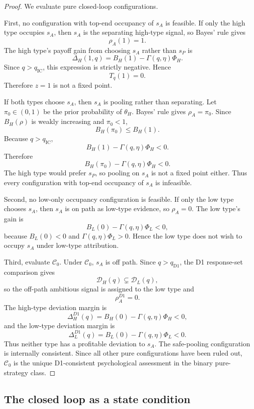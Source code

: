 \begin{proof}
We evaluate pure closed-loop configurations.

First, no configuration with top-end occupancy of \(s_A\) is feasible. If only the high type occupies \(s_A\), then \(s_A\) is the separating high-type signal, so Bayes' rule gives
\[
\rho_A(1)=1.
\]
The high type's payoff gain from choosing \(s_A\) rather than \(s_P\) is
\[
\Delta_H(1,q)=B_H(1)-\Gamma(q,\eta)\Phi_H.
\]
Since \(q>q_{\mathrm{IC}}\), this expression is strictly negative. Hence
\[
T_q(1)=0.
\]
Therefore \(z=1\) is not a fixed point.

If both types choose \(s_A\), then \(s_A\) is pooling rather than separating. Let \(\pi_0\in(0,1)\) be the prior probability of \(\theta_H\). Bayes' rule gives \(\rho_A=\pi_0\). Since \(B_H(\rho)\) is weakly increasing and \(\pi_0<1\),
\[
B_H(\pi_0)\le B_H(1).
\]
Because \(q>q_{\mathrm{IC}}\),
\[
B_H(1)-\Gamma(q,\eta)\Phi_H<0.
\]
Therefore
\[
B_H(\pi_0)-\Gamma(q,\eta)\Phi_H<0.
\]
The high type would prefer \(s_P\), so pooling on \(s_A\) is not a fixed point either. Thus every configuration with top-end occupancy of \(s_A\) is infeasible.

Second, no low-only occupancy configuration is feasible. If only the low type chooses \(s_A\), then \(s_A\) is on path as low-type evidence, so \(\rho_A=0\). The low type's gain is
\[
B_L(0)-\Gamma(q,\eta)\Phi_L<0,
\]
because \(B_L(0)<0\) and \(\Gamma(q,\eta)\Phi_L>0\). Hence the low type does not wish to occupy \(s_A\) under low-type attribution.

Third, evaluate \(\mathcal C_0\). Under \(\mathcal C_0\), \(s_A\) is off path. Since \(q>q_{\mathrm{D1}}\), the D1 response-set comparison gives
\[
\mathcal D_H(q)\subsetneq \mathcal D_L(q),
\]
so the off-path ambitious signal is assigned to the low type and
\[
\rho_A^{D1}=0.
\]
The high-type deviation margin is
\[
\Delta_H^{D1}(q)=B_H(0)-\Gamma(q,\eta)\Phi_H<0,
\]
and the low-type deviation margin is
\[
\Delta_L^{D1}(q)=B_L(0)-\Gamma(q,\eta)\Phi_L<0.
\]
Thus neither type has a profitable deviation to \(s_A\). The safe-pooling configuration is internally consistent. Since all other pure configurations have been ruled out, \(\mathcal C_0\) is the unique D1-consistent psychological assessment in the binary pure-strategy class.
\end{proof}

\subsection{The closed loop as a state condition}
\label{subsec:closed-loop}

